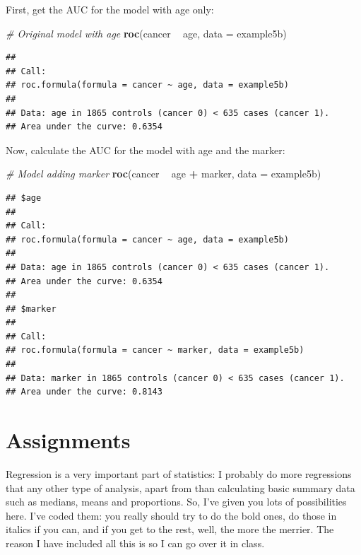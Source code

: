 \documentclass[]{book}
\newenvironment{Shaded}{\begin{snugshade}}{\end{snugshade}}
\newcommand{\CommentTok}[1]{\textcolor[rgb]{0.56,0.35,0.01}{\textit{#1}}}
\newcommand{\DataTypeTok}[1]{\textcolor[rgb]{0.13,0.29,0.53}{#1}}
\newcommand{\KeywordTok}[1]{\textcolor[rgb]{0.13,0.29,0.53}{\textbf{#1}}}
\newcommand{\NormalTok}[1]{#1}
\newcommand{\OperatorTok}[1]{\textcolor[rgb]{0.81,0.36,0.00}{\textbf{#1}}}
\newcommand{\StringTok}[1]{\textcolor[rgb]{0.31,0.60,0.02}{#1}}
\begin{document}
First, get the AUC for the model with age only:

\begin{Shaded}
\begin{Highlighting}[]
\CommentTok{# Original model with age}
\KeywordTok{roc}\NormalTok{(cancer }\OperatorTok{~}\StringTok{ }\NormalTok{age, }\DataTypeTok{data =}\NormalTok{ example5b)}
\end{Highlighting}
\end{Shaded}

\begin{verbatim}
## 
## Call:
## roc.formula(formula = cancer ~ age, data = example5b)
## 
## Data: age in 1865 controls (cancer 0) < 635 cases (cancer 1).
## Area under the curve: 0.6354
\end{verbatim}

Now, calculate the AUC for the model with age and the marker:

\begin{Shaded}
\begin{Highlighting}[]
\CommentTok{# Model adding marker}
\KeywordTok{roc}\NormalTok{(cancer }\OperatorTok{~}\StringTok{ }\NormalTok{age }\OperatorTok{+}\StringTok{ }\NormalTok{marker, }\DataTypeTok{data =}\NormalTok{ example5b)}
\end{Highlighting}
\end{Shaded}

\begin{verbatim}
## $age
## 
## Call:
## roc.formula(formula = cancer ~ age, data = example5b)
## 
## Data: age in 1865 controls (cancer 0) < 635 cases (cancer 1).
## Area under the curve: 0.6354
## 
## $marker
## 
## Call:
## roc.formula(formula = cancer ~ marker, data = example5b)
## 
## Data: marker in 1865 controls (cancer 0) < 635 cases (cancer 1).
## Area under the curve: 0.8143
\end{verbatim}

\hypertarget{assignments-4}{%
\section{Assignments}\label{assignments-4}}

Regression is a very important part of statistics: I probably do more
regressions that any other type of analysis, apart from than calculating
basic summary data such as medians, means and proportions. So, I've
given you lots of possibilities here. I've coded them: you really should
try to do the bold ones, do those in italics if you can, and if you get
to the rest, well, the more the merrier. The reason I have included all
this is so I can go over it in class.
\end{document}
